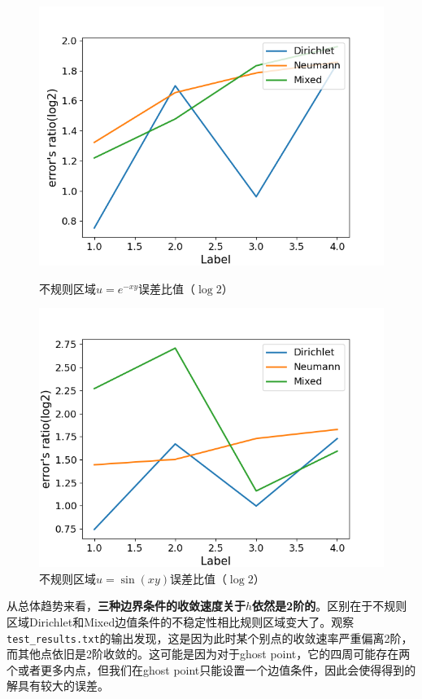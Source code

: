 \documentclass{ctexart}
\begin{document}
\begin{sloppypar}
\begin{figure}[H]
  \begin{minipage}[t]{0.5\linewidth}
    \centering
    \includegraphics[scale = 0.5]{f2_IPE.png}
    \caption{不规则区域$u=e^{-xy}$误差比值（$\log 2$）}
  \end{minipage}
  \begin{minipage}[t]{0.5\linewidth}
    \centering
    \includegraphics[scale = 0.5]{f3_IPE.png}
    \caption{不规则区域$u=\sin(xy)$误差比值（$\log 2$）}
  \end{minipage}
  \label{fig2}
\end{figure}
从总体趋势来看，\textbf{三种边界条件的收敛速度关于$h$依然是2阶的}。区别在于不规则区域Dirichlet和Mixed边值条件的不稳定性相比规则区域变大了。观察\verb|test_results.txt|的输出发现，这是因为此时某个别点的收敛速率严重偏离2阶，而其他点依旧是2阶收敛的。这可能是因为对于ghost point，它的四周可能存在两个或者更多内点，但我们在ghost point只能设置一个边值条件，因此会使得得到的解具有较大的误差。


\end{sloppypar}
\end{document}
